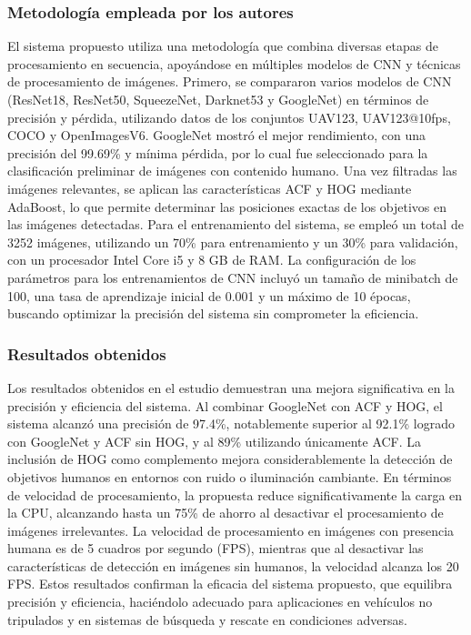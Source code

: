 \subsubsection{Metodología empleada por los autores}
El sistema propuesto utiliza una metodología que combina diversas etapas de procesamiento en secuencia, apoyándose en múltiples modelos de CNN y técnicas de procesamiento de imágenes. Primero, se compararon varios modelos de CNN (ResNet18, ResNet50, SqueezeNet, Darknet53 y GoogleNet) en términos de precisión y pérdida, utilizando datos de los conjuntos UAV123, UAV123@10fps, COCO y OpenImagesV6. GoogleNet mostró el mejor rendimiento, con una precisión del 99.69\% y mínima pérdida, por lo cual fue seleccionado para la clasificación preliminar de imágenes con contenido humano. Una vez filtradas las imágenes relevantes, se aplican las características ACF y HOG mediante AdaBoost, lo que permite determinar las posiciones exactas de los objetivos en las imágenes detectadas. Para el entrenamiento del sistema, se empleó un total de 3252 imágenes, utilizando un 70\% para entrenamiento y un 30\% para validación, con un procesador Intel Core i5 y 8 GB de RAM. La configuración de los parámetros para los entrenamientos de CNN incluyó un tamaño de minibatch de 100, una tasa de aprendizaje inicial de 0.001 y un máximo de 10 épocas, buscando optimizar la precisión del sistema sin comprometer la eficiencia.


\subsubsection{Resultados obtenidos}
Los resultados obtenidos en el estudio demuestran una mejora significativa en la precisión y eficiencia del sistema. Al combinar GoogleNet con ACF y HOG, el sistema alcanzó una precisión de 97.4\%, notablemente superior al 92.1\% logrado con GoogleNet y ACF sin HOG, y al 89\% utilizando únicamente ACF. La inclusión de HOG como complemento mejora considerablemente la detección de objetivos humanos en entornos con ruido o iluminación cambiante. En términos de velocidad de procesamiento, la propuesta reduce significativamente la carga en la CPU, alcanzando hasta un 75\% de ahorro al desactivar el procesamiento de imágenes irrelevantes. La velocidad de procesamiento en imágenes con presencia humana es de 5 cuadros por segundo (FPS), mientras que al desactivar las características de detección en imágenes sin humanos, la velocidad alcanza los 20 FPS. Estos resultados confirman la eficacia del sistema propuesto, que equilibra precisión y eficiencia, haciéndolo adecuado para aplicaciones en vehículos no tripulados y en sistemas de búsqueda y rescate en condiciones adversas.

